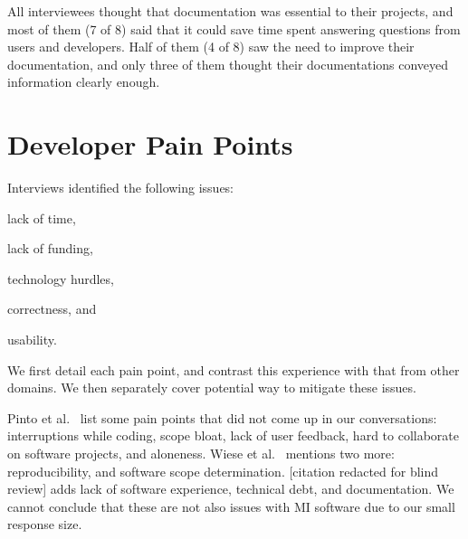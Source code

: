 \documentclass[doubleblind,12pt, 3p, times]{elsarticle}
\begin{document}
All interviewees thought that documentation was
essential to their projects, and most of them (7 of 8) said that it could save
time spent answering questions from users and developers. Half of them (4 of 8)
saw the need to improve their documentation, and only three of them thought 
their documentations conveyed information clearly enough.

\section{Developer Pain Points} \label{painpoints}

Interviews identified the following issues:
\begin{enumerate*}
\item lack of time,
\item lack of funding,
\item technology hurdles, 
\item correctness, and 
\item usability.  
\end{enumerate*}
We first detail each pain point, and contrast this experience with that
from other domains. We then separately cover potential way to mitigate these
issues.

Pinto et al.~\cite{PintoEtAl2018} list some pain points that did not come up in
our conversations: interruptions while coding, scope bloat, lack of user
feedback, hard to collaborate on software projects, and aloneness.  Wiese et
al.~\cite{WieseEtAl2019} mentions two more: reproducibility, and software scope
determination.  [citation redacted for blind review] %
adds lack of software experience, technical debt, and documentation.
We cannot conclude that these are not also issues with MI software due to our
small response size.
\end{document}
